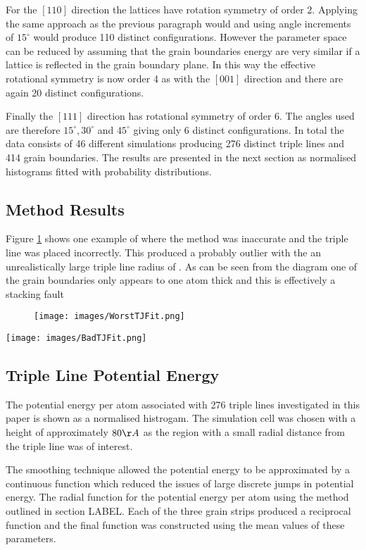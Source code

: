 \documentclass[12pt,a4paper]{book}
\begin{document}
For the $[1 1 0]$ direction the lattices have rotation symmetry of order 2. Applying the same approach as the previous paragraph would and using angle increments of $15^{\circ}$ would produce 110 distinct configurations. However the parameter space can be reduced by assuming that the grain boundaries energy are very similar if a lattice is reflected in the grain boundary plane. In this way the effective rotational symmetry is now order 4 as with the $[0 0 1]$ direction and there are again 20 distinct configurations.  

Finally the $[1 1 1]$ direction has rotational symmetry of order 6. The angles used are therefore $15^{\circ},30^{\circ}$  and $45^{\circ}$ giving only 6 distinct configurations. In total the data consists of 46 different simulations producing 276 distinct triple lines and 414 grain boundaries. The results are presented in the next section as normalised histograms fitted with probability distributions.  

\subsection{Method Results}

Figure \ref{fig:ErrorStacking} shows one example of where the method was inaccurate and the triple line was placed incorrectly. This produced a probably outlier with the an unrealistically large triple line radius of . As can be seen from the diagram one of the grain boundaries only appears to one atom thick and this is effectively a stacking fault 

\begin{figure}
	\texttt{[image: images/WorstTJFit.png]} 
	\label{fig:ErrorStacking}
\end{figure}



\texttt{[image: images/BadTJFit.png]} 

\subsection{Triple Line Potential Energy}

The potential energy per atom associated with 276 triple lines investigated in this paper is shown as a normalised histrogam. The simulation cell was chosen with a height of approximately $80\AA$ as the region with a small radial distance from the triple line was of interest. 

The smoothing technique allowed the potential energy to be approximated by a continuous function which reduced the issues of large discrete jumps in potential energy. The radial function for the potential energy per atom using the method outlined in section LABEL. Each of the three grain strips produced a reciprocal function and the final function was constructed using the mean values of these parameters. 
\end{document}
